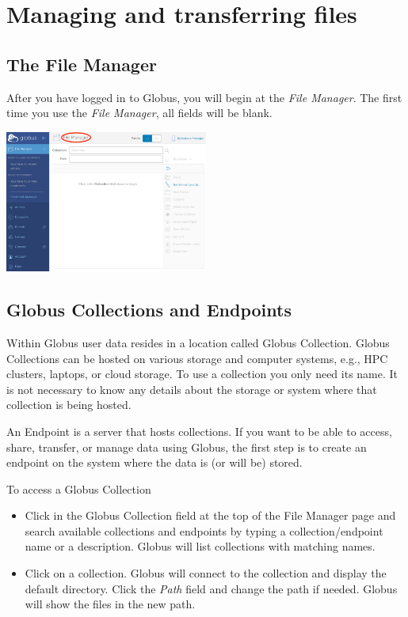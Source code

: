 \chapter{Managing and transferring files}

\section{The File Manager}\label{file-manager}

After you have logged in to Globus, you will begin at the \emph{File Manager}. 
The first time you use the \emph{File Manager}, all fields will be blank.

\begin{center}
\includegraphics[width=0.5\textwidth]{img/filemanager-1.png}
\end{center}

\section{Globus Collections and Endpoints}\label{collections-endpoints}

Within Globus user data resides in a location called \gls{Globus Collection}. 
Globus Collections can be hosted on various storage and computer systems, e.g., 
HPC clusters, laptops, or cloud storage. To use a collection you only need its name. 
It is not necessary to know any details about the storage or system 
where that collection is being hosted.

An \gls{Endpoint} is a server that hosts collections. If you want to be able to 
access, share, transfer, or manage data using Globus, the first step is to create 
an endpoint on the system where the data is (or will be) stored.

To access a Globus Collection
\begin{itemize}
\item Click in the \gls{Globus Collection} field at the top of the File Manager page 
and search available collections and endpoints by typing a collection/endpoint 
name or a description. Globus will list collections with matching names.
\item Click on a collection. Globus will connect to the collection and display 
the default directory. Click the \emph{Path} field and change the path if needed. 
Globus will show the files in the new path.
\end{itemize}

